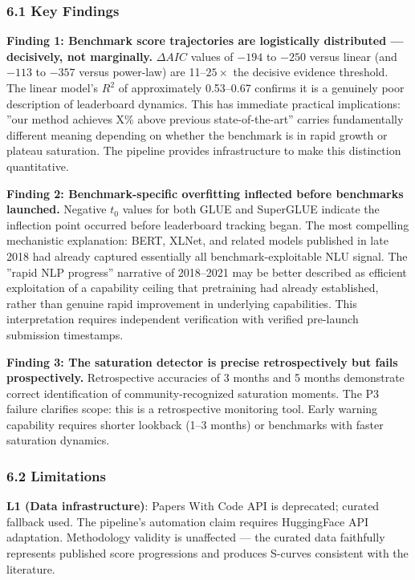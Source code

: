 
\subsubsection{6.1 Key Findings}

\textbf{Finding 1: Benchmark score trajectories are logistically distributed --- decisively, not marginally.} $\Delta AIC$ values of $-194$ to $-250$ versus linear (and $-113$ to $-357$ versus power-law) are 11--$25\times$ the decisive evidence threshold. The linear model's $R^2$ of approximately 0.53--0.67 confirms it is a genuinely poor description of leaderboard dynamics. This has immediate practical implications: ''our method achieves X\% above previous state-of-the-art'' carries fundamentally different meaning depending on whether the benchmark is in rapid growth or plateau saturation. The pipeline provides infrastructure to make this distinction quantitative.

\textbf{Finding 2: Benchmark-specific overfitting inflected before benchmarks launched.} Negative $t_0$ values for both GLUE and SuperGLUE indicate the inflection point occurred before leaderboard tracking began. The most compelling mechanistic explanation: BERT, XLNet, and related models published in late 2018 had already captured essentially all benchmark-exploitable NLU signal. The ''rapid NLP progress'' narrative of 2018--2021 may be better described as efficient exploitation of a capability ceiling that pretraining had already established, rather than genuine rapid improvement in underlying capabilities. This interpretation requires independent verification with verified pre-launch submission timestamps.

\textbf{Finding 3: The saturation detector is precise retrospectively but fails prospectively.} Retrospective accuracies of 3 months and 5 months demonstrate correct identification of community-recognized saturation moments. The P3 failure clarifies scope: this is a retrospective monitoring tool. Early warning capability requires shorter lookback (1--3 months) or benchmarks with faster saturation dynamics.

\subsubsection{6.2 Limitations}

\textbf{L1 (Data infrastructure)}: Papers With Code API is deprecated; curated fallback used. The pipeline's automation claim requires HuggingFace API adaptation. Methodology validity is unaffected --- the curated data faithfully represents published score progressions and produces S-curves consistent with the literature.

